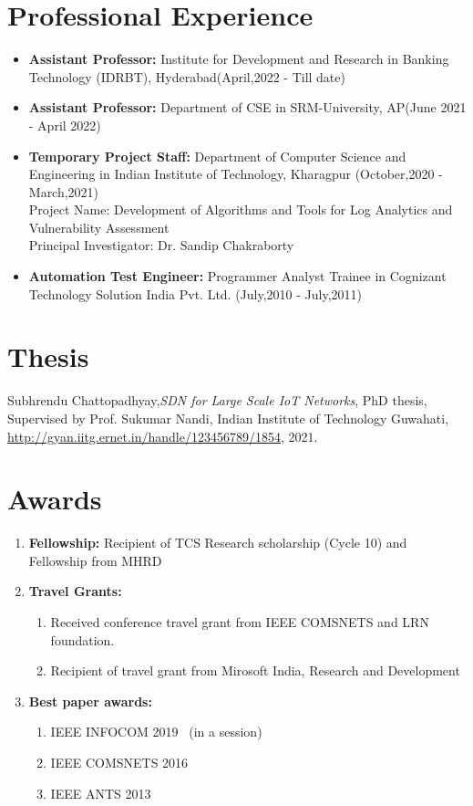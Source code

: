 \documentclass{article}
\begin{document}
\section{Professional Experience}
	\begin{itemize}
		\item{\bf Assistant Professor:} Institute for Development and Research in Banking Technology (IDRBT), Hyderabad(April,2022 - Till date)
		\item{\bf Assistant Professor:} Department of CSE in SRM-University, AP(June 2021 - April 2022)
		\item{\bf Temporary Project Staff:} Department of Computer Science and Engineering in Indian Institute of Technology, Kharagpur (October,2020 - March,2021)\\
	Project Name: Development of Algorithms and Tools for Log Analytics  and Vulnerability Assessment \\
	Principal Investigator: Dr. Sandip Chakraborty
		\item{\bf Automation Test Engineer:} Programmer Analyst Trainee in Cognizant Technology Solution India Pvt. Ltd. (July,2010 - July,2011)
	\end{itemize}

\section{Thesis}
Subhrendu Chattopadhyay,{\em SDN for Large Scale IoT Networks}, PhD thesis, Supervised by Prof. Sukumar Nandi, Indian Institute of Technology Guwahati, \url{http://gyan.iitg.ernet.in/handle/123456789/1854}, 2021.
\section{Awards}
	\begin{enumerate}
		\item{\bf Fellowship:} Recipient of TCS Research scholarship (Cycle 10) and Fellowship from MHRD
		\item {\bf Travel Grants:} 
			\begin{enumerate}
				\item Received conference travel grant from IEEE COMSNETS and LRN foundation.
				\item Recipient of travel grant from Mirosoft India, Research and Development
			\end{enumerate}
		\item {\bf Best paper awards:} 
			\begin{enumerate}
				\item IEEE INFOCOM 2019~\cite{chattopadhyay2018aloe} (in a session)
				\item IEEE COMSNETS 2016~\cite{chakraborty2016es2}
				\item IEEE ANTS 2013~\cite{chakraborty2013surpassing}
			\end{enumerate}
	\end{enumerate}
\end{document}
